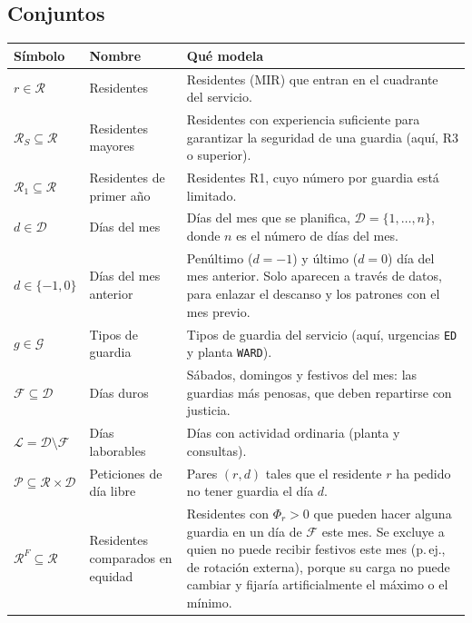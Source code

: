 \subsection{Conjuntos}

{\small
\begin{longtable}{@{}p{2.6cm}p{3.0cm}p{10.0cm}@{}}
\toprule
Símbolo & Nombre & Qué modela \\
\midrule
\endhead
$r \in \mathcal{R}$ & Residentes & Residentes (MIR) que entran en el cuadrante del servicio. \\
$\mathcal{R}_S \subseteq \mathcal{R}$ & Residentes mayores & Residentes con experiencia suficiente para garantizar la seguridad de una guardia (aquí, R3 o superior). \\
$\mathcal{R}_1 \subseteq \mathcal{R}$ & Residentes de primer año & Residentes R1, cuyo número por guardia está limitado. \\
$d \in \mathcal{D}$ & Días del mes & Días del mes que se planifica, $\mathcal{D} = \{1, \dots, n\}$, donde $n$ es el número de días del mes. \\
$d \in \{-1, 0\}$ & Días del mes anterior & Penúltimo ($d = -1$) y último ($d = 0$) día del mes anterior. Solo aparecen a través de datos, para enlazar el descanso y los patrones con el mes previo. \\
$g \in \mathcal{G}$ & Tipos de guardia & Tipos de guardia del servicio (aquí, urgencias \texttt{ED} y planta \texttt{WARD}). \\
$\mathcal{F} \subseteq \mathcal{D}$ & Días duros & Sábados, domingos y festivos del mes: las guardias más penosas, que deben repartirse con justicia. \\
$\mathcal{L} = \mathcal{D} \setminus \mathcal{F}$ & Días laborables & Días con actividad ordinaria (planta y consultas). \\
$\mathcal{P} \subseteq \mathcal{R} \times \mathcal{D}$ & Peticiones de día libre & Pares $(r, d)$ tales que el residente $r$ ha pedido no tener guardia el día $d$. \\
$\mathcal{R}^F \subseteq \mathcal{R}$ & Residentes comparados en equidad & Residentes con $\Phi_r > 0$ que pueden hacer alguna guardia en un día de $\mathcal{F}$ este mes. Se excluye a quien no puede recibir festivos este mes (p.\,ej., de rotación externa), porque su carga no puede cambiar y fijaría artificialmente el máximo o el mínimo. \\
\bottomrule
\end{longtable}\addtocounter{table}{-1}%
}

